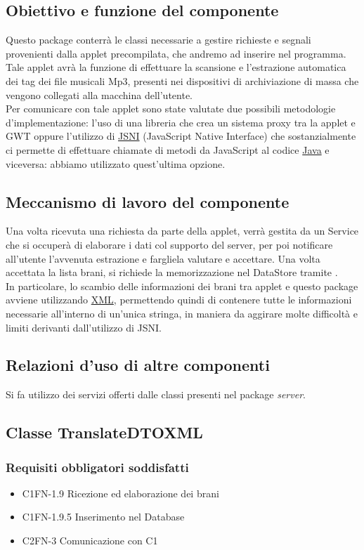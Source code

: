 \subsection*{Obiettivo e funzione del componente}
Questo package conterr\`a le classi necessarie a gestire richieste e segnali
provenienti dalla applet precompilata, che andremo ad inserire nel programma.
Tale applet avr\`a la funzione di effettuare la scansione e l'estrazione
automatica dei tag dei file musicali Mp3, presenti nei dispositivi di
archiviazione di massa che vengono collegati alla macchina dell'utente.\\
Per comunicare con tale applet sono state valutate due possibili metodologie
d'implementazione: l'uso di una libreria che crea un sistema proxy tra la applet
e GWT oppure l'utilizzo di \underline{JSNI} (JavaScript Native Interface) che
sostanzialmente ci permette di effettuare chiamate di metodi da JavaScript al
codice \underline{Java} e viceversa: abbiamo utilizzato quest'ultima opzione.
\subsection*{Meccanismo di lavoro del componente}
Una volta ricevuta una richiesta da parte della applet, verr\`a gestita da un
Service che si occuper\`a di elaborare i dati col supporto del server, per poi
notificare all'utente l'avvenuta estrazione e fargliela valutare e accettare.
Una volta accettata la lista brani, si richiede la memorizzazione nel DataStore
tramite .\\
In particolare, lo scambio delle informazioni dei brani tra applet e questo
package avviene utilizzando \underline{XML}, permettendo quindi di contenere
tutte le informazioni necessarie all'interno di un'unica stringa, in maniera da
aggirare molte difficolt\`a e limiti derivanti dall'utilizzo di JSNI.
\subsection*{Relazioni d'uso di altre componenti}
Si fa utilizzo dei servizi offerti dalle classi presenti nel package
\emph{server}.

\subsection{Classe TranslateDTOXML}
\subsubsection*{Requisiti obbligatori soddisfatti}
\begin{itemize}
    \item C1FN-1.9 Ricezione ed elaborazione dei brani
    \item C1FN-1.9.5 Inserimento nel Database
    \item C2FN-3 Comunicazione con C1
\end{itemize}
